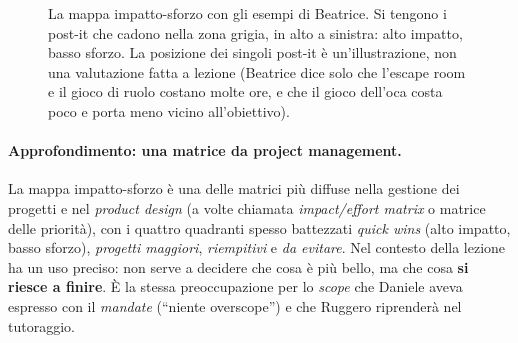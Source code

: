 \begin{figure}[htbp]
\centering
{}
\caption{La mappa impatto-sforzo con gli esempi di Beatrice. Si tengono i post-it
che cadono nella zona grigia, in alto a sinistra: alto impatto, basso sforzo. La
posizione dei singoli post-it è un'illustrazione, non una valutazione fatta a
lezione (Beatrice dice solo che l'escape room e il gioco di ruolo costano molte ore,
e che il gioco dell'oca costa poco e porta meno vicino all'obiettivo).}
\label{a7:fig:impatto}
\end{figure}

\paragraph{Approfondimento: una matrice da project management.} La mappa
impatto-sforzo è una delle matrici più diffuse nella gestione dei progetti e nel
\emph{product design} (a volte chiamata \emph{impact/effort matrix} o matrice delle
priorità), con i quattro quadranti spesso battezzati \emph{quick wins} (alto
impatto, basso sforzo), \emph{progetti maggiori}, \emph{riempitivi} e \emph{da
evitare}. Nel contesto della lezione ha un uso preciso: non serve a decidere che cosa
è più bello, ma che cosa \textbf{si riesce a finire}. È la stessa preoccupazione per
lo \emph{scope} che Daniele aveva espresso con il \emph{mandate} (``niente
overscope'') e che Ruggero riprenderà nel tutoraggio.

